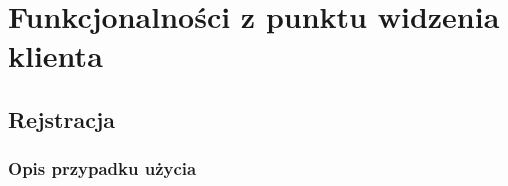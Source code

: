 \documentclass[12pt]{report}
\begin{document}
	
	\chapter{Funkcjonalności z punktu widzenia klienta}
	
	
	\section{Rejstracja}
		\subsection{Opis przypadku użycia}
		
\end{document}
